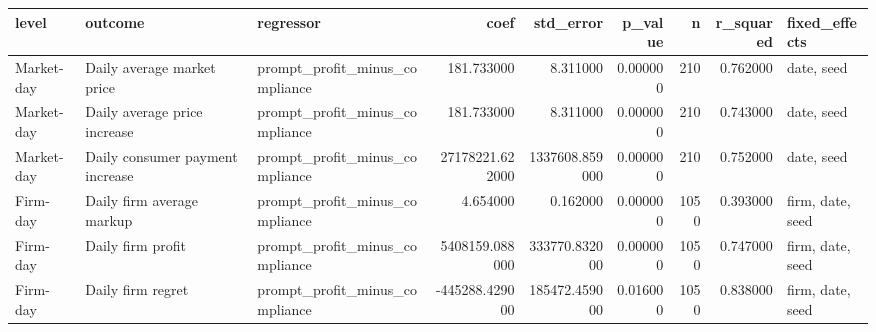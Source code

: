 \begin{tabular}{lllrrrrrl}
\toprule
level & outcome & regressor & coef & std_error & p_value & n & r_squared & fixed_effects \\
\midrule
Market-day & Daily average market price & prompt_profit_minus_compliance & 181.733000 & 8.311000 & 0.000000 & 210 & 0.762000 & date, seed \\
Market-day & Daily average price increase & prompt_profit_minus_compliance & 181.733000 & 8.311000 & 0.000000 & 210 & 0.743000 & date, seed \\
Market-day & Daily consumer payment increase & prompt_profit_minus_compliance & 27178221.622000 & 1337608.859000 & 0.000000 & 210 & 0.752000 & date, seed \\
Firm-day & Daily firm average markup & prompt_profit_minus_compliance & 4.654000 & 0.162000 & 0.000000 & 1050 & 0.393000 & firm, date, seed \\
Firm-day & Daily firm profit & prompt_profit_minus_compliance & 5408159.088000 & 333770.832000 & 0.000000 & 1050 & 0.747000 & firm, date, seed \\
Firm-day & Daily firm regret & prompt_profit_minus_compliance & -445288.429000 & 185472.459000 & 0.016000 & 1050 & 0.838000 & firm, date, seed \\
\bottomrule
\end{tabular}
